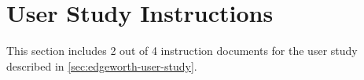 \chapter{\Edgeworth{} User Study Instructions}
\label{app:edgeworth-user-study-protocol}

This section includes 2 out of 4 instruction documents for the \Edgeworth{} user study described in \cref{sec:edgeworth-user-study}. 


